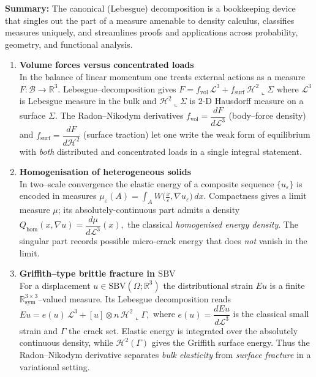 \documentclass[12pt]{article}
\theoremstyle{definition} %
\theoremstyle{plain} %
\begin{document}
\bigskip
\noindent\textbf{Summary:}\;
The canonical (Lebesgue) decomposition is a bookkeeping device that singles out the part of a measure amenable to density calculus, classifies measures uniquely, and streamlines proofs and applications across probability, geometry, and functional analysis.
\pagebreak
\begin{enumerate}
  \item \textbf{Volume forces versus concentrated loads} \\
        In the balance of linear momentum one treats external actions as a measure
        $F\!:\mathcal B\to\mathbb R^{3}$.
        Lebesgue–decomposition gives
        $
            F = f_{\text{vol}}\,\mathcal L^{3} + f_{\text{surf}}\,\mathcal H^{2}\!\llcorner\Sigma
        $
        where $\mathcal L^{3}$ is Lebesgue measure in the bulk and
        $\mathcal H^{2}\!\llcorner\Sigma$ is $2$-D Hausdorff measure on a surface $\Sigma$.
        The Radon–Nikodym derivatives
        $f_{\text{vol}}=\dfrac{dF}{d\mathcal L^{3}}$ (body–force density) and
        $f_{\text{surf}}=\dfrac{dF}{d\mathcal H^{2}}$ (surface traction)
        let one write the weak form of equilibrium with \emph{both} distributed and
        concentrated loads in a single integral statement. 

  \item \textbf{Homogenisation of heterogeneous solids} \\
        In two–scale convergence the elastic energy of a composite sequence
        $\{u_\varepsilon\}$ is encoded in measures
        $
            \mu_\varepsilon(A)=\int_A W\!\bigl(\tfrac{x}{\varepsilon},\nabla u_\varepsilon\bigr)\,dx .
        $
        Compactness gives a limit measure $\mu$; its absolutely-continuous part
        admits a density
        $
           Q_{\text{hom}}(x,\nabla u) = \dfrac{d\mu}{d\mathcal L^{3}}(x),
        $
        the classical {\it homogenised energy density}.
        The singular part records possible micro-crack energy that does \emph{not}
        vanish in the limit.  

  \item \textbf{Griffith–type brittle fracture in $\mathrm{SBV}$} \\
        For a displacement $u\in\mathrm{SBV}(\Omega;\mathbb R^{3})$ the distributional
        strain $E u$ is a finite $\mathbb R^{3\times3}_{\mathrm{sym}}$–valued measure.
        Its Lebesgue decomposition reads
        $
            Eu = e(u)\,\mathcal L^{3} + [u]\otimes n\,\mathcal H^{2}\!\llcorner\Gamma ,
        $
        where $e(u)=\dfrac{dEu}{d\mathcal L^{3}}$ is the classical small strain and
        $\Gamma$ the crack set.
        Elastic energy is integrated over the absolutely continuous density, while
        $\mathcal H^{2}(\Gamma)$ gives the Griffith surface energy.
        Thus the Radon–Nikodym derivative separates \emph{bulk elasticity} from
        \emph{surface fracture} in a variational setting.  


\end{enumerate}
\end{document}
